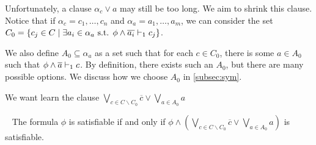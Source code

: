 Unfortunately, a clause $\alpha_c \lor a$ may still be too long. We aim to
shrink this clause. Notice that if $\alpha_c = c_1, \dots, c_n$ and $\alpha_a =
a_1, \dots, a_m$, we can consider the set $C_0 = \{c_j \in C \mid \exists a_i \in
\alpha_a \text{ s.t. } \phi \land \overline{a_i} \vdash_1 c_j \}$.







We also define $A_0 \subseteq \alpha_a$ as a set such that for each $c \in C_0$,
there is some $a \in A_0$ such that $\phi \land \overline{a} \vdash_1 c$. By definition,
there exists such an $A_0$, but there are many possible options. We discuss how
we choose $A_0$ in \autoref{subsec:sym}.



We want learn the clause $\bigvee_{c \in C \backslash C_0} \overline{c} \lor
\bigvee_{a \in A_0} a$


\begin{theorem}~\label{thm:shrunkgbcequisat}
    The formula $\phi$ is satisfiable if and only if $\phi \land (\bigvee_{c \in C \backslash C_0} \overline{c} \lor \bigvee_{a \in A_0} a)$ is satisfiable.
\end{theorem}

